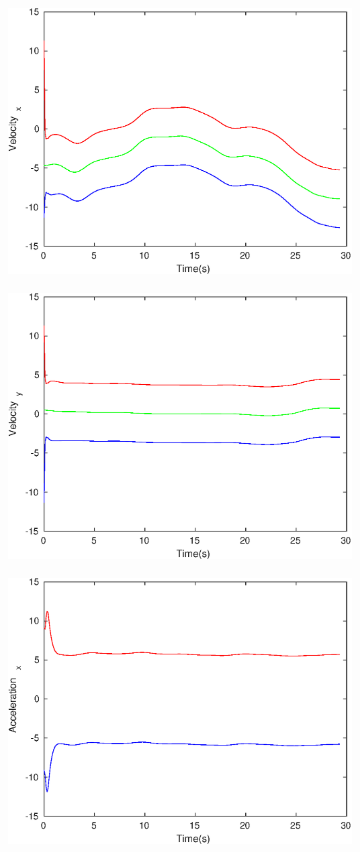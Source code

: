 \begin{figure}[h]
\begin{subfigure}{.5\linewidth}
\centering
\includegraphics[width=.9\linewidth]{figures/Frad/s3csSMVelocity_x}
\end{subfigure}
\begin{subfigure}{.5\linewidth}
\centering
\includegraphics[width=.9\linewidth]{figures/Frad/s3csSMVelocity_y}
\end{subfigure}
\begin{subfigure}{.5\linewidth}
\centering
\includegraphics[width=.9\linewidth]{figures/Frad/s3csSMAcceleration_x}

\end{subfigure}
\end{figure}
